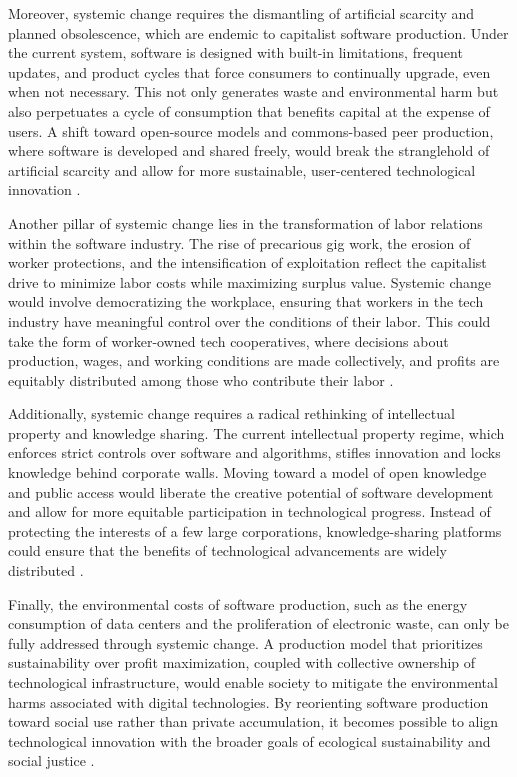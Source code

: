 \begin{refsection}
Moreover, systemic change requires the dismantling of artificial scarcity and planned obsolescence, which are endemic to capitalist software production. Under the current system, software is designed with built-in limitations, frequent updates, and product cycles that force consumers to continually upgrade, even when not necessary. This not only generates waste and environmental harm but also perpetuates a cycle of consumption that benefits capital at the expense of users. A shift toward open-source models and commons-based peer production, where software is developed and shared freely, would break the stranglehold of artificial scarcity and allow for more sustainable, user-centered technological innovation \cite[pp.~151-154]{klein2002}.

Another pillar of systemic change lies in the transformation of labor relations within the software industry. The rise of precarious gig work, the erosion of worker protections, and the intensification of exploitation reflect the capitalist drive to minimize labor costs while maximizing surplus value. Systemic change would involve democratizing the workplace, ensuring that workers in the tech industry have meaningful control over the conditions of their labor. This could take the form of worker-owned tech cooperatives, where decisions about production, wages, and working conditions are made collectively, and profits are equitably distributed among those who contribute their labor \cite[pp.~131-134]{scholz2017}.

Additionally, systemic change requires a radical rethinking of intellectual property and knowledge sharing. The current intellectual property regime, which enforces strict controls over software and algorithms, stifles innovation and locks knowledge behind corporate walls. Moving toward a model of open knowledge and public access would liberate the creative potential of software development and allow for more equitable participation in technological progress. Instead of protecting the interests of a few large corporations, knowledge-sharing platforms could ensure that the benefits of technological advancements are widely distributed \cite[pp.~89-91]{lessig2004}.

Finally, the environmental costs of software production, such as the energy consumption of data centers and the proliferation of electronic waste, can only be fully addressed through systemic change. A production model that prioritizes sustainability over profit maximization, coupled with collective ownership of technological infrastructure, would enable society to mitigate the environmental harms associated with digital technologies. By reorienting software production toward social use rather than private accumulation, it becomes possible to align technological innovation with the broader goals of ecological sustainability and social justice \cite[pp.~203-205]{maxwell2012}.


\end{refsection}
